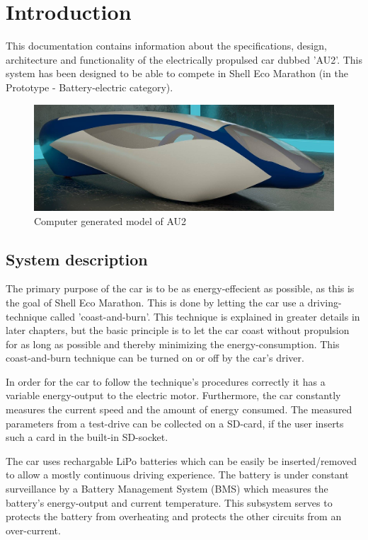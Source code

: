 \chapter{Introduction}
This documentation contains information about the specifications, design, architecture and functionality of the electrically propulsed car dubbed 'AU2'. This system has been designed to be able to compete in Shell Eco Marathon (in the Prototype - Battery-electric category).

\begin{figure}[H]
	\centering
	\includegraphics[width=0.6\linewidth]{Introduction/Model}
	\caption{Computer generated model of AU2}
	\label{fig:System_model}
\end{figure}

\section{System description}

The primary purpose of the car is to be as energy-effecient as possible, as this is the goal of Shell Eco Marathon. This is done by letting the car use a driving-technique called 'coast-and-burn'. This technique is explained in greater details in later chapters, but the basic principle is to let the car coast without propulsion for as long as possible and thereby minimizing the energy-consumption. This coast-and-burn technique can be turned on or off by the car's driver.

In order for the car to follow the technique's procedures correctly it has a variable energy-output to the electric motor. Furthermore, the car constantly measures the current speed and the amount of energy consumed. The measured parameters from a test-drive can be collected on a SD-card, if the user inserts such a card in the built-in SD-socket.

The car uses rechargable LiPo batteries which can be easily be inserted/removed to allow a mostly continuous driving experience. The battery is under constant surveillance by a Battery Management System (BMS) which measures the battery's energy-output and current temperature. This subsystem serves to protects the battery from overheating and protects the other circuits from an over-current.

